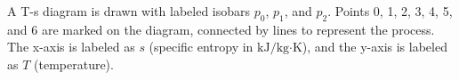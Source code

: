 A T-s diagram is drawn with labeled isobars \( p_0 \), \( p_1 \), and \( p_2 \). Points 0, 1, 2, 3, 4, 5, and 6 are marked on the diagram, connected by lines to represent the process. The x-axis is labeled as \( s \) (specific entropy in \( \text{kJ/kg·K} \)), and the y-axis is labeled as \( T \) (temperature).